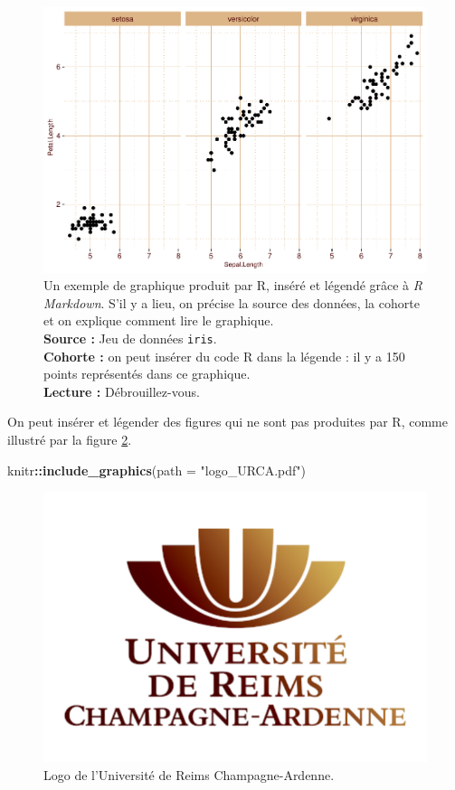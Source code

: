 \documentclass[french,]{compterendu}
\newenvironment{Shaded}{\begin{snugshade}}{\end{snugshade}}
\newcommand{\AttributeTok}[1]{\textcolor[rgb]{0.13,0.29,0.53}{#1}}
\newcommand{\FunctionTok}[1]{\textcolor[rgb]{0.13,0.29,0.53}{\textbf{#1}}}
\newcommand{\NormalTok}[1]{#1}
\newcommand{\SpecialCharTok}[1]{\textcolor[rgb]{0.81,0.36,0.00}{\textbf{#1}}}
\newcommand{\StringTok}[1]{\textcolor[rgb]{0.31,0.60,0.02}{#1}}
\theoremstyle{urcastyle}
\theoremstyle{remark}
\begin{document}
\begin{figure}
\centering
\includegraphics{R-markdown--world_airport_files/figure-latex/dotplotex-1.pdf}
\caption{\label{fig:dotplotex}Un exemple de graphique produit par R, inséré et légendé grâce à \emph{R Markdown}. S'il y a lieu, on précise la source des données, la cohorte et on explique comment lire le graphique.\\
\textbf{Source :} Jeu de données \texttt{iris}.\\
\textbf{Cohorte :} on peut insérer du code R dans la légende : il y a 150 points représentés dans ce graphique.\\
\textbf{Lecture :} Débrouillez-vous.}
\end{figure}

On peut insérer et légender des figures qui ne sont pas produites par R, comme illustré par la figure \ref{fig:logourca}.



\begin{Shaded}
\begin{Highlighting}[]
\NormalTok{knitr}\SpecialCharTok{::}\FunctionTok{include\_graphics}\NormalTok{(}\AttributeTok{path =} \StringTok{"logo\_URCA.pdf"}\NormalTok{)}
\end{Highlighting}
\end{Shaded}

\begin{figure}

{\centering \includegraphics[width=0.2\linewidth]{logo_URCA} 

}

\caption{Logo de l'Université de Reims Champagne-Ardenne.}\label{fig:logourca}
\end{figure}
\end{document}
